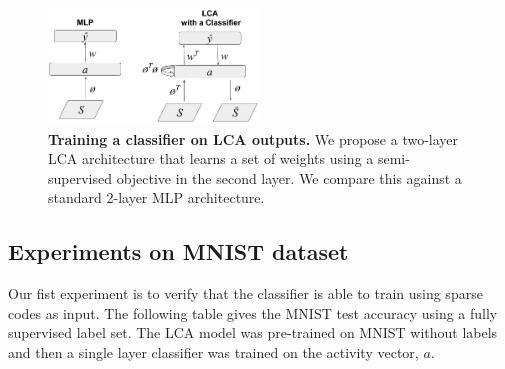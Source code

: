 
\begin{figure}\label{fig:ch3_mlp_lcaf_architectures}
    \centering
    \includegraphics[width=0.5\textwidth]{figures/mlp_lcaf_architectures.png}
    \caption{\textbf{Training a classifier on LCA outputs.} We propose a two-layer LCA architecture that learns a set of weights using a semi-supervised objective in the second layer. We compare this against a standard 2-layer MLP architecture.}
\end{figure}

\subsection{Experiments on MNIST dataset}
Our fist experiment is to verify that the classifier is able to train using sparse codes as input. The following table gives the MNIST test accuracy using a fully supervised label set. The LCA model was pre-trained on MNIST without labels and then a single layer classifier was trained on the activity vector, $a$.

